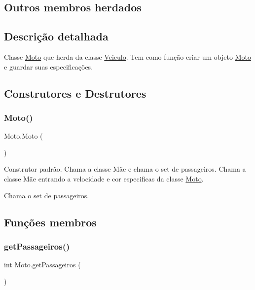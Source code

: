\subsection*{Outros membros herdados}


\subsection{Descrição detalhada}
Classe \mbox{\hyperlink{class_moto}{Moto}} que herda da classe \mbox{\hyperlink{class_veiculo}{Veiculo}}. Tem como função criar um objeto \mbox{\hyperlink{class_moto}{Moto}} e guardar suas especificações. 

\subsection{Construtores e Destrutores}
\mbox{\label{class_moto_af900d6c1d6b9a69fb6b8bdb0c3401603}} 
\subsubsection{\texorpdfstring{Moto()}{Moto()}}
{\footnotesize\ttfamily Moto.\+Moto (\begin{DoxyParamCaption}{ }\end{DoxyParamCaption})\hspace{0.3cm}{\ttfamily [inline]}}

Construtor padrão. Chama a classe Mãe e chama o set de passageiros. Chama a classe Mãe entrando a velocidade e cor especificas da classe \mbox{\hyperlink{class_moto}{Moto}}.

Chama o set de passageiros. 

\subsection{Funções membros}
\mbox{\label{class_moto_af285d528cc9d6e1dd47db8d7a36a08bd}} 
\subsubsection{\texorpdfstring{get\+Passageiros()}{getPassageiros()}}
{\footnotesize\ttfamily int Moto.\+get\+Passageiros (\begin{DoxyParamCaption}{ }\end{DoxyParamCaption})\hspace{0.3cm}{\ttfamily [inline]}}

